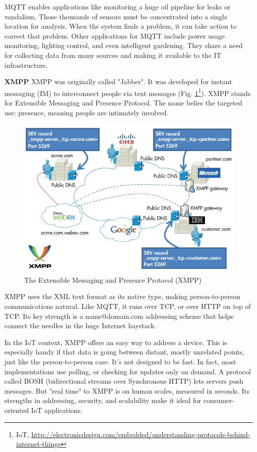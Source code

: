       MQTT enables applications like monitoring a huge oil pipeline for leaks or vandalism. Those thousands of sensors must be concentrated into a single location for analysis. When the system finds a problem, it can take action to correct that problem. Other applications for MQTT include power usage monitoring, lighting control, and even intelligent gardening. They share a need for collecting data from many sources and making it available to the IT infrastructure.

     \textbf{XMPP}
      \newline 
      XMPP was originally called "Jabber". It was developed for instant messaging (IM) to interconnect people via text messages (Fig. \ref{img:XMPP}\footnote{IoT, \url{http://electronicdesign.com/embedded/understanding-protocols-behind-internet-things}}). XMPP stands for Extensible Messaging and Presence Protocol. The name belies the targeted use: presence, meaning people are intimately involved.
      \begin{figure}[!ht]
      \centering
      \includegraphics[scale=0.7]{images/XMPP.png}   
      \caption[The Extensible Messaging and Presence Protocol (XMPP)]{The Extensible Messaging and Presence Protocol (XMPP)}
      \label{img:XMPP}                           
      \end{figure}
      XMPP uses the XML text format as its native type, making person-to-person communications natural. Like MQTT, it runs over TCP, or over HTTP on top of TCP. Its key strength is a name@domain.com addressing scheme that helps connect the needles in the huge Internet haystack.

      In the IoT context, XMPP offers an easy way to address a device. This is especially handy if that data is going between distant, mostly unrelated points, just like the person-to-person case. It’s not designed to be fast. In fact, most implementations use polling, or checking for updates only on demand. A protocol called BOSH (bidirectional streams over Synchronous HTTP) lets servers push messages. But "real time" to XMPP is on human scales, measured in seconds. Its strengths in addressing, security, and scalability make it ideal for consumer-oriented IoT applications.

